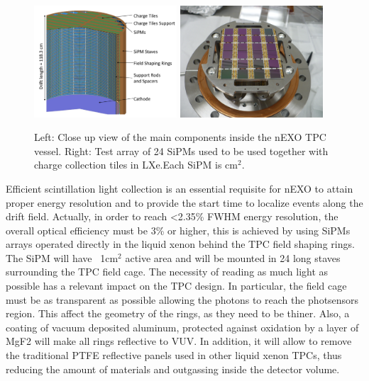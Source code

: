 \begin{figure}[t!]
\begin{center}
\includegraphics[width=0.475\textwidth]{img/nexo_design}
\includegraphics[width=0.475\textwidth]{img/nexo_sipms}
\end{center}
\caption{Left: Close up view of the main components inside the nEXO TPC vessel. Right: Test array of 24 SiPMs used to be used together with charge collection tiles in LXe.Each SiPM is cm$^2$.} \label{fig:nexo}
\end{figure}

Efficient scintillation light collection is an essential requisite for nEXO to attain proper energy resolution and to provide the start time to localize events along the drift field. Actually, in order to reach <2.35\% FWHM energy resolution, the overall optical efficiency must be 3\%  or higher, this is achieved by using SiPMs arrays operated directly in the liquid xenon behind the TPC field shaping rings. The SiPM will have ~1cm$^2$ active area and will be mounted in 24 long staves surrounding the TPC field cage. The necessity of reading as much light as possible has a relevant impact on the TPC design. In particular, the field cage must be as transparent as possible allowing the photons to reach the photsensors region. This affect the geometry of the rings, as they need to be thiner. Also, a coating of vacuum deposited aluminum, protected against oxidation by a layer of MgF2 will make all rings reflective to VUV. In addition, it will allow to remove the traditional PTFE reflective panels used in other liquid xenon TPCs, thus reducing the amount of materials and outgassing inside the detector volume.

